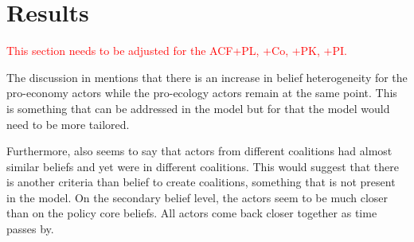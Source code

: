 \documentclass[12pt]{article}
\begin{document}


\section{Results}
\label{sec:}

\textcolor{red}{This section needs to be adjusted for the ACF+PL, +Co, +PK, +PI.}

The discussion in \cite{markard2016socio} mentions that there is an increase in belief heterogeneity for the pro-economy actors while the pro-ecology actors remain at the same point.  This is something that can be addressed in the model but for that the model would need to be more tailored.

Furthermore, \cite{markard2016socio} also seems to say that actors from different coalitions had almost similar beliefs and yet were in different coalitions. This would suggest that there is another criteria than belief to create coalitions, something that is not present in the model. On the secondary belief level, the actors seem to be much closer than on the policy core beliefs. All actors come back closer together as time passes by.

 


\appendix
\end{document}

